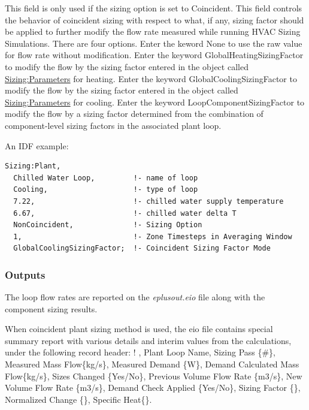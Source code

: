 This field is only used if the sizing option is set to Coincident. This field controls the behavior of coincident sizing with respect to what, if any, sizing factor should be applied to further modify the flow rate measured while running HVAC Sizing Simulations. There are four options. Enter the keword None to use the raw value for flow rate without modification. Enter the keyword GlobalHeatingSizingFactor to modify the flow by the sizing factor entered in the object called \hyperref[sizingparameters]{Sizing:Parameters} for heating. Enter the keyword GlobalCoolingSizingFactor to modify the flow by the sizing factor entered in the object called \hyperref[sizingparameters]{Sizing:Parameters} for cooling. Enter the keyword LoopComponentSizingFactor to modify the flow by a sizing factor determined from the combination of component-level sizing factors in the associated plant loop.

An IDF example:

\begin{lstlisting}
Sizing:Plant,
  Chilled Water Loop,         !- name of loop
  Cooling,                    !- type of loop
  7.22,                       !- chilled water supply temperature
  6.67,                       !- chilled water delta T
  NonCoincident,              !- Sizing Option
  1,                          !- Zone Timesteps in Averaging Window
  GlobalCoolingSizingFactor;  !- Coincident Sizing Factor Mode
\end{lstlisting}

\subsubsection{Outputs}\label{outputs-3-004}

The loop flow rates are reported on the \emph{eplusout.eio} file along with the component sizing results.

When coincident plant sizing method is used, the eio file contains special summary report with various details and interim values from the calculations, under the following record header: ! , Plant Loop Name, Sizing Pass \{\#\}, Measured Mass Flow\{kg/s\}, Measured Demand \{W\}, Demand Calculated Mass Flow\{kg/s\}, Sizes Changed \{Yes/No\}, Previous Volume Flow Rate \{m3/s\}, New Volume Flow Rate \{m3/s\}, Demand Check Applied \{Yes/No\}, Sizing Factor \{\}, Normalized Change \{\}, Specific Heat\{\}.
